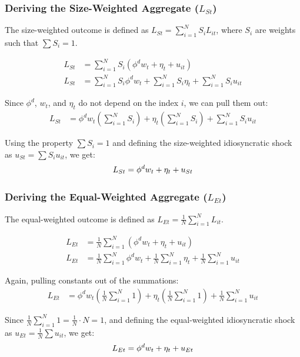 \documentclass[aspectratio=169,11pt]{beamer}
\begin{document}
\begin{frame} \label{app_size_weighted}
    \frametitle{Deriving the Size-Weighted Aggregate ($L_{St}$)}
    The size-weighted outcome is defined as $L_{St} = \sum_{i=1}^N S_i L_{it}$, where $S_i$ are weights such that $\sum S_i = 1$.

    \begin{align*}
        L_{St} & = \sum_{i=1}^N S_i (\phi^d w_t + \eta_t + u_{it})                                 \\
        L_{St} & = \sum_{i=1}^N S_i \phi^d w_t + \sum_{i=1}^N S_i \eta_t + \sum_{i=1}^N S_i u_{it}
    \end{align*}

    Since $\phi^d$, $w_t$, and $\eta_t$ do not depend on the index $i$, we can pull them out:
    \begin{align*}
        L_{St} & = \phi^d w_t \left( \sum_{i=1}^N S_i \right) + \eta_t \left( \sum_{i=1}^N S_i \right) + \sum_{i=1}^N S_i u_{it}
    \end{align*}

    Using the property $\sum S_i = 1$ and defining the size-weighted idiosyncratic shock as $u_{St} = \sum S_i u_{it}$, we get:
    \begin{equation}
        L_{St} = \phi^d w_t + \eta_t + u_{St} \notag
    \end{equation}
    \vspace{0.1cm}
    \hfill \hyperlink{src_equal_weighted}{}
\end{frame}

\begin{frame} \label{app_equal_weighted}
    \frametitle{Deriving the Equal-Weighted Aggregate ($L_{Et}$)}
    The equal-weighted outcome is defined as $L_{Et} = \frac{1}{N} \sum_{i=1}^N L_{it}$.

    \begin{align*}
        L_{Et} & = \frac{1}{N} \sum_{i=1}^N (\phi^d w_t + \eta_t + u_{it})                                                 \\
        L_{Et} & = \frac{1}{N} \sum_{i=1}^N \phi^d w_t + \frac{1}{N} \sum_{i=1}^N \eta_t + \frac{1}{N} \sum_{i=1}^N u_{it}
    \end{align*}

    Again, pulling constants out of the summations:
    \begin{align*}
        L_{Et} & = \phi^d w_t \left( \frac{1}{N} \sum_{i=1}^N 1 \right) + \eta_t \left( \frac{1}{N} \sum_{i=1}^N 1 \right) + \frac{1}{N} \sum_{i=1}^N u_{it}
    \end{align*}

    Since $\frac{1}{N} \sum_{i=1}^N 1 = \frac{1}{N} \cdot N = 1$, and defining the equal-weighted idiosyncratic shock as $u_{Et} = \frac{1}{N} \sum u_{it}$, we get:
    \begin{equation}
        L_{Et} = \phi^d w_t + \eta_t + u_{Et} \notag
    \end{equation}
    \vspace{0.1cm}
    \hfill \hyperlink{src_equal_weighted}{}
\end{frame}
\end{document}
